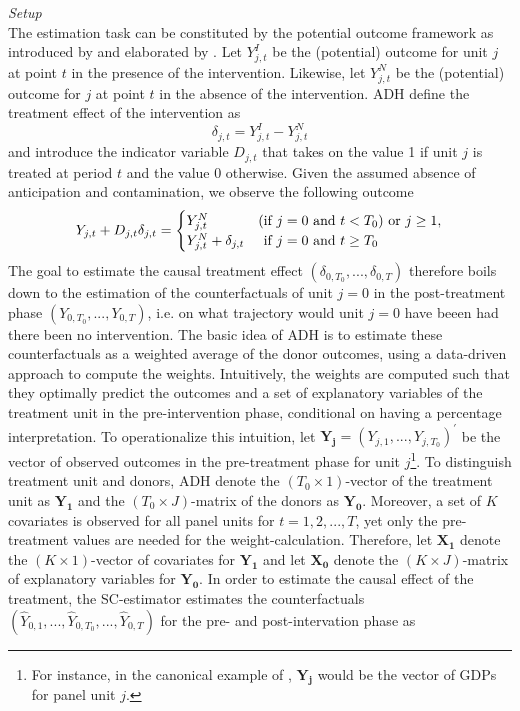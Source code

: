 \textit{Setup} \\
The estimation task can be constituted by the potential outcome framework as introduced by \cite{neyman:1923} and elaborated by \cite{rubin:1974}. Let $Y^{I}_{j,t}$ be the (potential) outcome for unit $j$ at point $t$ in the presence of the intervention. Likewise, let $Y^{N}_{j,t}$ be the (potential) outcome for $j$ at point $t$ in the absence of the intervention. \ac{ADH} define the treatment effect of the intervention as 
\[
\delta_{j,t} = Y^{I}_{j,t} - Y^{N}_{j,t}
\] 
and introduce the indicator variable $D_{j,t}$ that takes on the value 1 if unit $j$ is treated at period $t$ and the value 0 otherwise. Given the assumed absence of anticipation and contamination, we observe the following outcome
\[
Y_{j,t} + D_{j,t} \delta_{j,t} = 
\begin{cases}
	Y^{N}_{j,t} &\text{(if } j = 0 \text{ and } t < T_0\text{)} \text{ or } j \geq 1, \\
	Y^{N}_{j,t} + \delta_{j,t} &  \text{\phantom{(}if } j = 0 \text{ and } t \geq T_0
\end{cases}
\] 
The goal to estimate the causal treatment effect $(\delta_{0,T_0}, ..., \delta_{0,T})$ therefore boils down to the estimation of the counterfactuals of unit $j = 0$ in the post-treatment phase $(Y_{0,T_0}, ..., Y_{0,T})$, i.e. on what trajectory would unit $j=0$ have beeen had there been no intervention. The basic idea of \ac{ADH} is to estimate these counterfactuals as a weighted average of the donor outcomes, using a data-driven approach to compute the weights. Intuitively, the weights are computed such that they optimally predict the outcomes and a set of explanatory variables of the treatment unit in the pre-intervention phase, conditional on having a percentage interpretation. To operationalize this intuition, let $\boldsymbol{Y_j} = (Y_{j,1}, ..., Y_{j,T_0})^\prime$ be the vector of observed outcomes in the pre-treatment phase for unit $j$\footnote{For instance, in the canonical example of \cite{abadie:2003}, $\boldsymbol{Y_j}$ would be the vector of \ac{GDP}s for panel unit $j$.}. To distinguish treatment unit and donors, \ac{ADH} denote the $(T_0 \times 1)$-vector of the treatment unit as $\boldsymbol{Y_1}$ and the $(T_0 \times J)$-matrix of the donors as $\boldsymbol{Y_0}$. Moreover, a set of $K$ covariates is observed for all panel units for $t = 1,2,...,T$, yet only the pre-treatment values are needed for the weight-calculation. Therefore, let $\boldsymbol{X_1}$ denote the $(K \times 1)$-vector of covariates for $\boldsymbol{Y_1}$ and let $\boldsymbol{X_0}$ denote the $(K \times J)$-matrix of explanatory variables for $\boldsymbol{Y_0}$. In order to estimate the causal effect of the treatment, the \ac{SC}-estimator estimates the counterfactuals $(\widehat{Y}_{0,1}, ...,\widehat{Y}_{0,T_0},..., \widehat{Y}_{0,T})$ for the pre- and post-intervation phase as 
